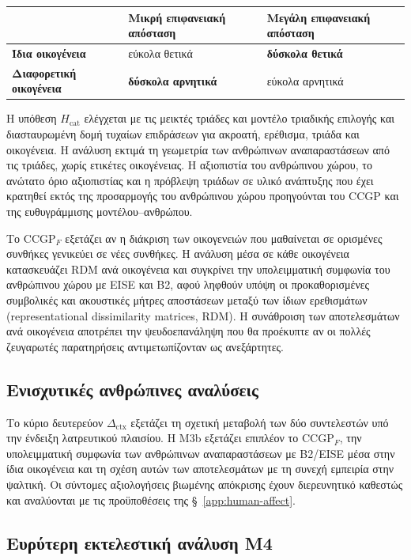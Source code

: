 \documentclass[11pt,a4paper]{article}
\begin{document}
\begin{center}\small
\begin{tabularx}{0.9\textwidth}{@{}p{}YY@{}}
\toprule
& \textbf{Μικρή επιφανειακή απόσταση} & \textbf{Μεγάλη επιφανειακή απόσταση}\tabularnewline
\midrule
\textbf{Ίδια οικογένεια} & εύκολα θετικά & \textbf{δύσκολα θετικά}\tabularnewline
\midrule
\textbf{Διαφορετική οικογένεια} & \textbf{δύσκολα αρνητικά} & εύκολα αρνητικά\tabularnewline
\bottomrule
\end{tabularx}
\end{center}

Η υπόθεση $H_{\mathrm{cat}}$ ελέγχεται με τις μεικτές τριάδες και μοντέλο τριαδικής επιλογής και διασταυρωμένη δομή τυχαίων επιδράσεων για ακροατή, ερέθισμα, τριάδα και οικογένεια. Η ανάλυση εκτιμά τη γεωμετρία των ανθρώπινων αναπαραστάσεων από τις τριάδες, χωρίς ετικέτες οικογένειας. Η αξιοπιστία του ανθρώπινου χώρου, το ανώτατο όριο αξιοπιστίας και η πρόβλεψη τριάδων σε υλικό ανάπτυξης που έχει κρατηθεί εκτός της προσαρμογής του ανθρώπινου χώρου προηγούνται του CCGP και της ευθυγράμμισης μοντέλου--ανθρώπου.

Το $\mathrm{CCGP}_F$ εξετάζει αν η διάκριση των οικογενειών που μαθαίνεται σε ορισμένες συνθήκες γενικεύει σε νέες συνθήκες. Η ανάλυση μέσα σε κάθε οικογένεια κατασκευάζει RDM ανά οικογένεια και συγκρίνει την υπολειμματική συμφωνία του ανθρώπινου χώρου με EISE και B2, αφού ληφθούν υπόψη οι προκαθορισμένες συμβολικές και ακουστικές μήτρες αποστάσεων μεταξύ των ίδιων ερεθισμάτων (representational dissimilarity matrices, RDM). Η συνάθροιση των αποτελεσμάτων ανά οικογένεια αποτρέπει την ψευδοεπανάληψη που θα προέκυπτε αν οι πολλές ζευγαρωτές παρατηρήσεις αντιμετωπίζονταν ως ανεξάρτητες.

\subsection{Ενισχυτικές ανθρώπινες αναλύσεις}\label{sec:human-secondary}

Το κύριο δευτερεύον $\Delta_{\mathrm{ctx}}$ εξετάζει τη σχετική μεταβολή των δύο συντελεστών υπό την ένδειξη λατρευτικού πλαισίου. Η M3b εξετάζει επιπλέον το $\mathrm{CCGP}_F$, την υπολειμματική συμφωνία των ανθρώπινων αναπαραστάσεων με B2/EISE μέσα στην ίδια οικογένεια και τη σχέση αυτών των αποτελεσμάτων με τη συνεχή εμπειρία στην ψαλτική. Οι σύντομες αξιολογήσεις βιωμένης απόκρισης έχουν διερευνητικό καθεστώς και αναλύονται με τις προϋποθέσεις της §~\ref{app:human-affect}.

\subsection{Ευρύτερη εκτελεστική ανάλυση M4}\label{sec:m4-broader}
\end{document}
